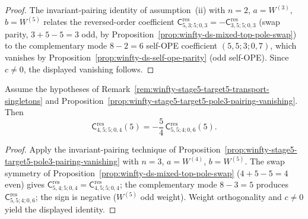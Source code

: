 \begin{proof}
The invariant-pairing identity of assumption~\textup{(ii)} with \(n=2\), \(a=W^{(3)}\), \(b=W^{(5)}\) relates the reversed-order coefficient \(\mathsf{C}^{\mathrm{res}}_{5,3;5;0,3}=-\mathsf{C}^{\mathrm{res}}_{3,5;5;0,3}\) (swap parity, \(3+5-5=3\) odd, by Proposition~\ref{prop:winfty-ds-mixed-top-pole-swap}) to the complementary mode \(8-2=6\) self-OPE coefficient \((5,5;3;0,7)\), which vanishes by Proposition~\ref{prop:winfty-ds-self-ope-parity} (odd self-OPE). Since \(c\neq 0\), the displayed vanishing follows.
\end{proof}

\begin{proposition}
\label{prop:winfty-stage5-target5-pole4-from-self-return}
Assume the hypotheses of
Remark~\ref{rem:winfty-stage5-target5-transport-singletons} and
Proposition~\ref{prop:winfty-stage5-target5-pole3-pairing-vanishing}.
Then
\[
\mathsf{C}^{\mathrm{res}}_{4,5;5;0,4}(5)
=
-\frac{5}{4}\,
\mathsf{C}^{\mathrm{res}}_{5,5;4;0,6}(5).
\]
\end{proposition}

\begin{proof}
Apply the invariant-pairing technique of Proposition~\ref{prop:winfty-stage5-target5-pole3-pairing-vanishing} with \(n=3\), \(a=W^{(4)}\), \(b=W^{(5)}\). The swap symmetry of Proposition~\ref{prop:winfty-ds-mixed-top-pole-swap} (\(4+5-5=4\) even) gives \(\mathsf{C}^{\mathrm{res}}_{5,4;5;0,4}=\mathsf{C}^{\mathrm{res}}_{4,5;5;0,4}\); the complementary mode \(8-3=5\) produces \(\mathsf{C}^{\mathrm{res}}_{5,5;4;0,6}\); the sign is negative (\(W^{(5)}\) odd weight). Weight orthogonality and \(c\neq 0\) yield the displayed identity.
\end{proof}

